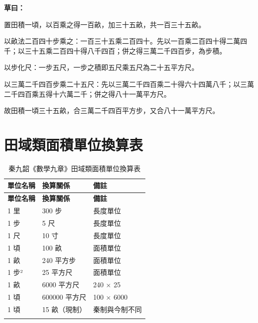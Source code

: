 \documentclass[11pt,a4paper]{article}
\newenvironment{calculation}{%
  \medskip\noindent{\color{caocolor}\rule{0.4\textwidth}{0.4pt}}%
  \par\color{caocolor}%
}{%
  \par\medskip%
}
\begin{document}
\begin{calculation}
\textbf{草曰：}

置田積一頃，以百乘之得一百畝，加三十五畝，共一百三十五畝。

以畝法二百四十步乘之：一百三十五乘二百四十。先以一百乘二百四十得二萬四千；以三十五乘二百四十得八千四百；併之得三萬二千四百步，為步積。

以步化尺：一步五尺，一步之積即五尺乘五尺為二十五平方尺。

以三萬二千四百步乘二十五尺：先以三萬二千四百乘二十得六十四萬八千；以三萬二千四百乘五得十六萬二千；併之得八十一萬平方尺。

故田積一頃三十五畝，合三萬二千四百平方步，又合八十一萬平方尺。
\end{calculation}

\newpage

\section*{田域類面積單位換算表}

\begin{center}
\begin{longtable}{|l|l|l|}
\hline
\textbf{單位名稱} & \textbf{換算關係} & \textbf{備註} \\
\hline
\endfirsthead
\hline
\textbf{單位名稱} & \textbf{換算關係} & \textbf{備註} \\
\hline
\endhead
1 里 & 300 步 & 長度單位 \\
\hline
1 步 & 5 尺 & 長度單位 \\
\hline
1 尺 & 10 寸 & 長度單位 \\
\hline
1 頃 & 100 畝 & 面積單位 \\
\hline
1 畝 & 240 平方步 & 面積單位 \\
\hline
1 步² & 25 平方尺 & 面積單位 \\
\hline
1 畝 & 6000 平方尺 & 240 × 25 \\
\hline
1 頃 & 600000 平方尺 & 100 × 6000 \\
\hline
1 頃 & 15 畝（現制） & 秦制與今制不同 \\
\hline
\caption{秦九韶《數學九章》田域類面積單位換算表}
\end{longtable}
\end{center}

\newpage
\end{document}
